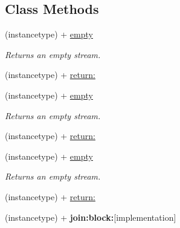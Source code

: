 \subsection*{Class Methods}
\begin{DoxyCompactItemize}
\item 
\mbox{\label{interface_r_a_c_stream_a69ef18fc6577b859633f39ac181f5152}} 
(instancetype) + \mbox{\hyperlink{interface_r_a_c_stream_a69ef18fc6577b859633f39ac181f5152}{empty}}
\begin{DoxyCompactList}\small\item\em Returns an empty stream. \end{DoxyCompactList}\item 
(instancetype) + \mbox{\hyperlink{interface_r_a_c_stream_ab3497f3cf2f0d43e90d375dc26ed12ba}{return\+:}}
\item 
\mbox{\label{interface_r_a_c_stream_a69ef18fc6577b859633f39ac181f5152}} 
(instancetype) + \mbox{\hyperlink{interface_r_a_c_stream_a69ef18fc6577b859633f39ac181f5152}{empty}}
\begin{DoxyCompactList}\small\item\em Returns an empty stream. \end{DoxyCompactList}\item 
(instancetype) + \mbox{\hyperlink{interface_r_a_c_stream_ab3497f3cf2f0d43e90d375dc26ed12ba}{return\+:}}
\item 
\mbox{\label{interface_r_a_c_stream_a69ef18fc6577b859633f39ac181f5152}} 
(instancetype) + \mbox{\hyperlink{interface_r_a_c_stream_a69ef18fc6577b859633f39ac181f5152}{empty}}
\begin{DoxyCompactList}\small\item\em Returns an empty stream. \end{DoxyCompactList}\item 
(instancetype) + \mbox{\hyperlink{interface_r_a_c_stream_ab3497f3cf2f0d43e90d375dc26ed12ba}{return\+:}}
\item 
\mbox{\label{interface_r_a_c_stream_abc6de8c8bb1869cfd1dcfc3d7386fc52}} 
(instancetype) + {\bfseries join\+:block\+:}{\ttfamily  \mbox{[}implementation\mbox{]}}
\item 
\mbox{\label{interface_r_a_c_stream_abc6de8c8bb1869cfd1dcfc3d7386fc52}} 

\end{DoxyCompactItemize}
